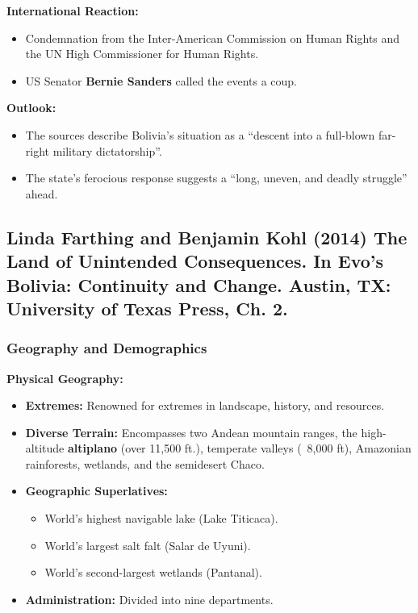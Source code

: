 \documentclass{article}
\begin{document}
    \noindent \textbf{International Reaction:}
    \begin{itemize}
        \item Condemnation from the Inter-American Commission on Human
        Rights and the UN High Commissioner for Human Rights.
        \item US Senator \textbf{Bernie Sanders} called the events a coup.
    \end{itemize}

    \noindent \textbf{Outlook:}
    \begin{itemize}
        \item The sources describe Bolivia's situation as a ``descent into a
        full-blown far-right military dictatorship''.
        \item The state's ferocious response suggests a ``long, uneven, and
        deadly struggle'' ahead.
    \end{itemize}

    \subsection{Linda Farthing and Benjamin Kohl (2014) The Land of Unintended Consequences. In Evo’s Bolivia: Continuity and Change. Austin, TX: University of Texas Press, Ch. 2.}

    \subsubsection{Geography and Demographics}

    \noindent \textbf{Physical Geography:}
    \begin{itemize}
        \item \textbf{Extremes:} Renowned for extremes in landscape,
        history, and resources.
        \item \textbf{Diverse Terrain:} Encompasses two Andean mountain
        ranges, the high-altitude \textbf{altiplano} (over 11,500 ft.),
        temperate valleys (~8,000 ft), Amazonian rainforests, wetlands, and
        the semidesert Chaco.
        \item \textbf{Geographic Superlatives:}
        \begin{itemize}
            \item World's highest navigable lake (Lake Titicaca).
            \item World's largest salt falt (Salar de Uyuni).
            \item World's second-largest wetlands (Pantanal).
        \end{itemize}
        \item \textbf{Administration:} Divided into nine departments.
    \end{itemize}
\end{document}
